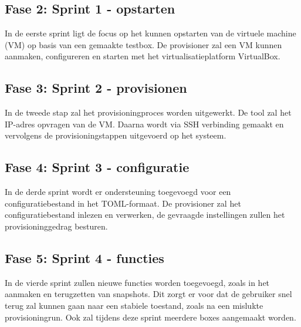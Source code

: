 



\subsection{Fase 2: Sprint 1 - opstarten}
In de eerste sprint ligt de focus op het kunnen opstarten van de virtuele machine (VM) op basis van een gemaakte testbox. De provisioner zal een VM kunnen aanmaken, configureren en starten met het virtualisatieplatform VirtualBox.

\subsection{Fase 3: Sprint 2 - provisionen}
In de tweede stap zal het provisioningproces worden uitgewerkt. De tool zal het IP-adres opvragen van de VM. Daarna wordt via SSH verbinding gemaakt en vervolgens de provisioningstappen uitgevoerd op het systeem.

\subsection{Fase 4: Sprint 3 - configuratie}
In de derde sprint wordt er ondersteuning toegevoegd voor een configuratiebestand in het TOML-formaat. De provisioner zal het configuratiebestand inlezen en verwerken, de gevraagde instellingen zullen het provisioninggedrag besturen.

\subsection{Fase 5: Sprint 4 - functies}
In de vierde sprint zullen nieuwe functies worden toegevoegd, zoals in het aanmaken en terugzetten van snapshots. Dit zorgt er voor dat de gebruiker snel terug zal kunnen gaan naar een stabiele toestand, zoals na een mislukte provisioningrun. Ook zal tijdens deze sprint meerdere boxes aangemaakt worden.

